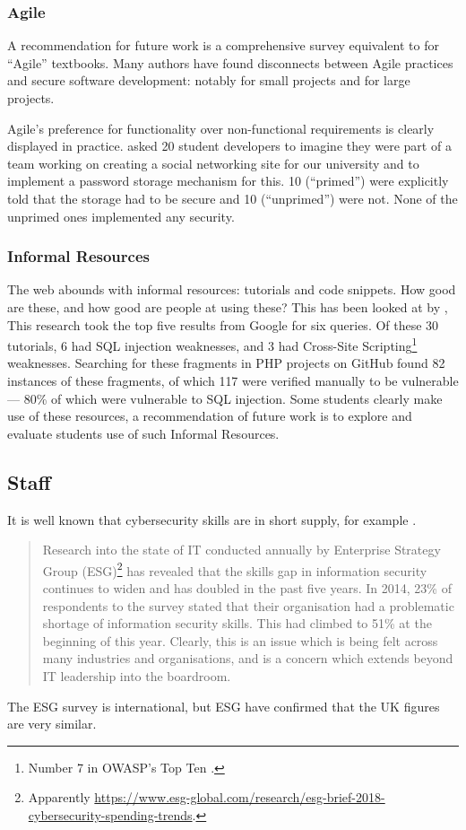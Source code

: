\documentclass[conference]{IEEEtran}
\begin{document}
\subsubsection{Agile}
A recommendation for future work is a comprehensive survey equivalent to \cite{Drop2019} for ``Agile'' textbooks. Many authors have found disconnects between Agile practices and secure software development: notably \cite{Bartsch2011a} for small projects and \cite{vanderHeijden:2018:EPS:3239235.3267426} for large projects.
\par
Agile's preference for functionality over non-functional requirements is clearly displayed in practice. \cite{Naiakshinaetal2017a} asked 20 student developers to imagine they
were part of a team working on creating a social networking site for
our university and to implement a password storage mechanism for this. 10 (``primed'') were explicitly told that the storage had to be secure and 10 (``unprimed'') were not. None of the unprimed ones implemented any security.
\subsubsection{Informal Resources}\label{sec:informal}
The web abounds with informal resources: tutorials and code snippets. How good are these, and how good are people at using these? This has been looked at by \cite{Unruhetal2017a}, This research took the top five results from Google for six queries. Of these 30 tutorials, 6 had SQL injection weaknesses, and 3 had Cross-Site Scripting\footnote{Number 7 in OWASP's Top Ten \cite{OWASP2017a}.} weaknesses. Searching for these fragments in PHP projects on GitHub found 82 instances of these fragments, of which 117 were verified manually to be vulnerable --- 80\% of which were vulnerable to SQL injection. Some students clearly make use of these resources, a recommendation of future work is to explore and evaluate students use of such Informal Resources. 

\subsection{Staff}
It is well known that cybersecurity skills are in short supply, for example \cite{Page2018a}.
\begin{quote}
Research into the state of IT conducted annually by Enterprise Strategy Group (ESG)\footnote{Apparently \url{https://www.esg-global.com/research/esg-brief-2018-cybersecurity-spending-trends}.} has revealed that the skills gap in information security continues to widen and has doubled in the past five years. In 2014, 23\% of respondents to the survey stated that their organisation had a problematic shortage of information security skills. This had climbed to 51\% at the beginning of this year. Clearly, this is an issue which is being felt across many industries and organisations, and is a concern which extends beyond IT leadership into the boardroom.
\end{quote}
The ESG survey is international, but ESG have confirmed that the UK figures are very similar.
\end{document}
